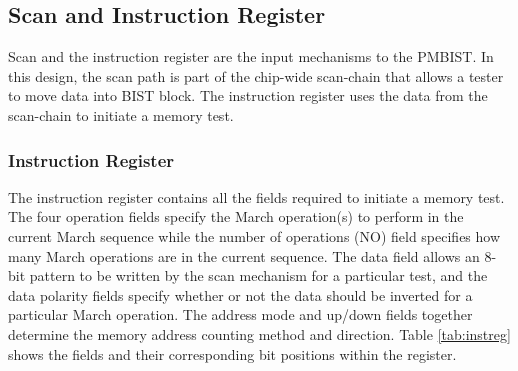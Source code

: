 \subsection{Scan and Instruction Register}
\label{sect:bg-blocks-scan-and-instruction-register}
Scan and the instruction register are the input mechanisms to the PMBIST.  In this design, the scan path is part of the chip-wide scan-chain that allows a tester to move data into BIST block.  The instruction register uses the data from the scan-chain to initiate a memory test.

\subsubsection{Instruction Register}
The instruction register contains all the fields required to initiate a memory test.  The four operation fields specify the March operation(s) to perform in the current March sequence while the number of operations (NO) field specifies how many March operations are in the current sequence.  The data field allows an 8-bit pattern to be written by the scan mechanism for a particular test, and the data polarity fields specify whether or not the data should be inverted for a particular March operation.  The address mode and up/down fields together determine the memory address counting method and direction.  Table \ref{tab:instreg} shows the fields and their corresponding bit positions within the register.

